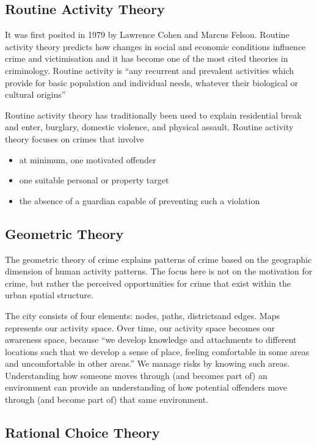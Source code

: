 \documentclass{article}
\begin{document}
\subsection{Routine Activity Theory}

It was first posited in 1979 by Lawrence Cohen and Marcus Felson. Routine activity theory predicts how changes in social and economic conditions influence crime and victimisation and it has become one of the most cited theories in criminology. Routine activity is “any recurrent and prevalent activities which provide for basic population and individual needs, whatever their biological or cultural origins”

Routine activity theory has traditionally been used to explain residential break and enter, burglary, domestic violence, and physical assault. Routine activity theory focuses on crimes that involve 
\begin{itemize}
    \item at minimum, one motivated offender
    \item one suitable personal or property target
    \item the absence of a guardian capable of preventing such a violation
\end{itemize}

\subsection{Geometric Theory}

The geometric theory of crime explains patterns of crime based on the geographic dimension of human activity patterns. The focus here is not on the motivation for crime, but rather the perceived opportunities for crime that exist within the urban spatial structure.

The city consists of four elements: nodes, paths, districtsand edges. Maps represents our activity space. Over time, our activity space becomes our awareness space, because “we develop knowledge and attachments to different locations such that we develop a sense of place, feeling comfortable in some areas and uncomfortable in other areas.” We manage risks by knowing such areas. Understanding how someone moves through (and becomes part of) an environment can provide an understanding of how potential offenders move through (and become part of) that same environment.

\subsection{Rational Choice Theory}
\end{document}
